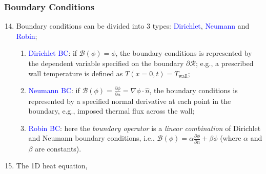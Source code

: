 \documentclass[10pt,compress]{beamer}
\begin{document}
\begin{frame}
 \frametitle{Boundary Conditions} 
 \begin{enumerate}
   \setcounter{enumi}{13}   
   \item <1-> Boundary conditions can be divided into 3 types: \textcolor{blue}{Dirichlet}, \textcolor{blue}{Neumann} and \textcolor{blue}{Robin};
      \begin{enumerate}
          \item <2-> \textcolor{blue}{Dirichlet BC}: if $\mathcal{B}\left(\phi\right)=\phi$, the boundary conditions is represented by the dependent variable specified on the boundary $\partial\mathcal{R}$; e.g., a prescribed wall temperature is defined as $T\left(x=0,t\right)=T_{\text{wall}}$;
          \item <3-> \textcolor{blue}{Neumann BC}: if $\mathcal{B}\left(\phi\right) = \frac{\partial\phi}{\partial n}=\nabla\phi\cdot\hat{n}$, the boundary conditions is represented by a specified normal derivative at each point in the boundary, e.g., imposed thermal flux across the wall;
          \item <4-> \textcolor{blue}{Robin BC}: here the {\it boundary operator} is a {\it linear combination} of Dirichlet and Neumann boundary conditions, i.e., $\mathcal{B}\left(\phi\right)=\alpha\frac{\partial\phi}{\partial n}+ \beta\phi$ (where $\alpha$ and $\beta$ are constants).
      \end{enumerate} 
   \item <5->   The 1D heat equation,
 \end{enumerate}   
 
\end{frame}
\end{document}
